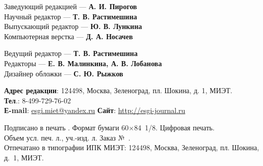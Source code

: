 \noindent
\begin{minipage}[t]{.48\textwidth}
    
    \begin{flushleft}
        \scriptsize
        Заведующий редакцией — \textbf{А. И. Пирогов}\\
        Научный редактор — \textbf{Т. В. Растимешина}\\
        Выпускающий редактор — \textbf{Ю. В. Лункина}\\
        Компьютерная верстка — \textbf{Д. А. Носачев}
    \end{flushleft}
\end{minipage}\hspace{0.04\textwidth}
\begin{minipage}[t]{.48\textwidth}
    \begin{flushleft}
        \scriptsize
Ведущий редактор — \textbf{Т. В. Растимешина}\\
Редакторы — \textbf{Е. В. Малинкина, А. В. Лобанова}\\
Дизайнер обложки — \textbf{С. Ю. Рыжков}
    \end{flushleft}
\end{minipage}

\begin{flushleft}
    \scriptsize
    \textbf{Адрес редакции}: 124498, Москва, Зеленоград, пл. Шокина, д. 1, МИЭТ.\\
    \textbf{Тел}.: 8-499-729-76-02\\
    \textbf{Е-mail}: \href{mailto:esgi.miet@yandex.ru}{esgi.miet@yandex.ru} \hspace{3em}
    \textbf{Сайт}: \url{http://esgi-journal.ru}

     \vspace{1em}
    Подписано в печать \esgiPDate. Формат бумаги 60\(×\)84 1/8. Цифровая печать.\\
    Объем \esgiUPL{} усл. печ. л., \esgiUIL{} уч.-изд. л. Заказ № \esgiPRN{}.\\
    Отпечатано в типографии ИПК МИЭТ: 124498, Москва, Зеленоград, пл. Шокина, д. 1, МИЭТ.
\end{flushleft}

\normalsize
\setmainlinespread

\newpage